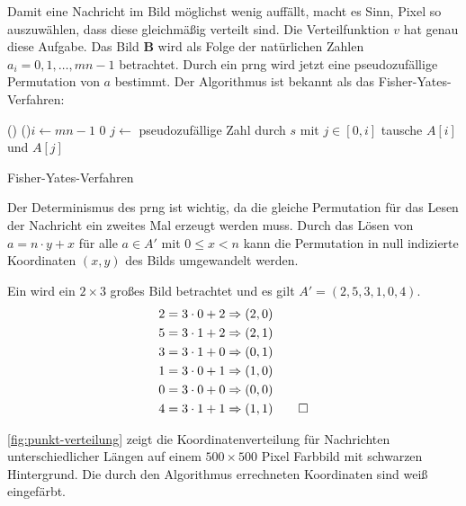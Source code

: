 \noindent
Damit eine Nachricht im Bild möglichst wenig auffällt, macht es Sinn, Pixel
so auszuwählen, dass diese gleichmäßig verteilt sind. Die Verteilfunktion $v$ hat genau diese
Aufgabe. Das Bild $\mathbf{B}$ wird als Folge der natürlichen Zahlen
$a_i = 0,1,\ldots,mn - 1$ betrachtet.
Durch ein \acs{prng} wird jetzt
eine pseudozufällige Permutation von $a$ bestimmt. Der Algorithmus ist bekannt
als das Fisher-Yates-Verfahren:

\begin{singlespace}
  \begin{algorithm}[h]
    \DontPrintSemicolon
    \Begin(){
      \For(){$i \leftarrow mn - 1$ \KwTo $0$}{
        $j \leftarrow$ pseudozufällige Zahl durch $s$ mit $j \in [0,i]$\;
        tausche $A[i]$ und $A[j]$\;
      }
      \;
    }
    \caption{Fisher-Yates-Verfahren}
    \label{alg:fisher-yates-verfahren}
  \end{algorithm}
\end{singlespace}


\noindent
Der Determinismus des \acs{prng} ist wichtig, da die gleiche Permutation
für das Lesen der Nachricht ein zweites Mal erzeugt werden muss.
Durch das Lösen von $a = n \cdot y + x$ für alle $a \in A'$ mit $0 \leq x < n$
kann die Permutation in null indizierte Koordinaten $(x,y)$ des Bilds umgewandelt werden.
\begin{example}
  Ein wird ein $2 \times 3$ großes Bild betrachtet und es gilt $A' = (2,5,3,1,0,4)$.
  \begin{align*}
    2 & = 3 \cdot 0 + 2 \Rightarrow (2,0)          \\
    5 & = 3 \cdot 1 + 2 \Rightarrow (2,1)          \\
    3 & = 3 \cdot 1 + 0 \Rightarrow (0,1)          \\
    1 & = 3 \cdot 0 + 1 \Rightarrow (1,0)          \\
    0 & = 3 \cdot 0 + 0 \Rightarrow (0,0)          \\
    4 & = 3 \cdot 1 + 1 \Rightarrow (1,1) \qedhere
  \end{align*}
\end{example}

\noindent
\autoref{fig:punkt-verteilung} zeigt die Koordinatenverteilung für Nachrichten unterschiedlicher
Längen auf einem $500 \times 500$ Pixel Farbbild mit schwarzen Hintergrund. Die durch den Algorithmus
errechneten Koordinaten sind weiß eingefärbt.

